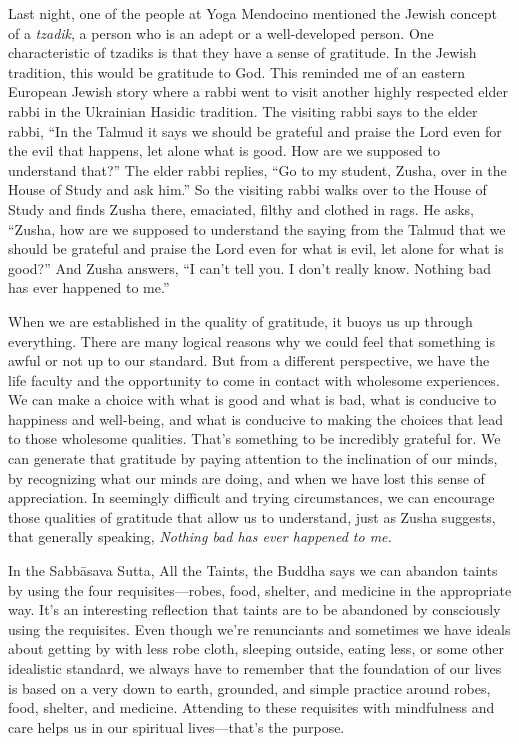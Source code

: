 Last night, one of the people at Yoga Mendocino mentioned the Jewish 
concept of a \emph{tzadik}, a person who is an adept or a 
well-developed person. One characteristic of tzadiks is that they have 
a sense of gratitude. In the Jewish tradition, this would be gratitude 
to God. This reminded me of an eastern European Jewish story where a 
rabbi went to visit another highly respected elder rabbi in the 
Ukrainian Hasidic tradition. The visiting rabbi says to the elder 
rabbi, ``In the Talmud it says we should be grateful and praise the 
Lord even for the evil that happens, let alone what is good. How are we 
supposed to understand that?'' The elder rabbi replies, ``Go to my 
student, Zusha, over in the House of Study and ask him.'' So the 
visiting rabbi walks over to the House of Study and finds Zusha there, 
emaciated, filthy and clothed in rags. He asks, ``Zusha, how are we 
supposed to understand the saying from the Talmud that we should be 
grateful and praise the Lord even for what is evil, let alone for what 
is good?'' And Zusha answers, ``I can't tell you. I don't really know. 
Nothing bad has ever happened to me.''

When we are established in the quality of gratitude, it buoys us up 
through everything. There are many logical reasons why we could feel 
that something is awful or not up to our standard. But from a different 
perspective, we have the life faculty and the opportunity to come in 
contact with wholesome experiences. We can make a choice with what is 
good and what is bad, what is conducive to happiness and well-being, 
and what is conducive to making the choices that lead to those 
wholesome qualities. That's something to be incredibly grateful for. We 
can generate that gratitude by paying attention to the inclination of 
our minds, by recognizing what our minds are doing, and when we have 
lost this sense of appreciation. In seemingly difficult and trying 
circumstances, we can encourage those qualities of gratitude that allow 
us to understand, just as Zusha suggests, that generally speaking, 
\emph{Nothing bad has ever happened to me.}


In the Sabbāsava Sutta, All the Taints, the Buddha says we can abandon 
taints by using the four requisites---robes, food, shelter, and 
medicine in the appropriate way. It's an interesting reflection that 
taints are to be abandoned by consciously using the requisites. Even 
though we're renunciants and sometimes we have ideals about getting by 
with less robe cloth, sleeping outside, eating less, or some other 
idealistic standard, we always have to remember that the foundation of 
our lives is based on a very down to earth, grounded, and simple 
practice around robes, food, shelter, and medicine. Attending to these 
requisites with mindfulness and care helps us in our spiritual 
lives---that's the purpose.

